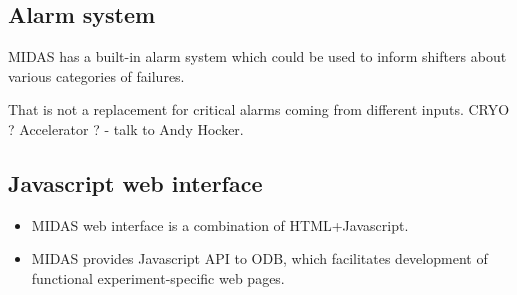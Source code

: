 \subsection{Alarm system}

MIDAS has a built-in alarm system which could be used to inform shifters
about various categories of failures.

That is not a replacement for critical alarms coming from different inputs.
CRYO ? Accelerator ? - talk to Andy Hocker.

\subsection{Javascript web interface}

\begin{itemize}
\item 
  MIDAS web interface is a combination of HTML+Javascript.
\item 
  MIDAS provides Javascript API to ODB, which facilitates development of
  functional experiment-specific web pages.
\end{itemize}




